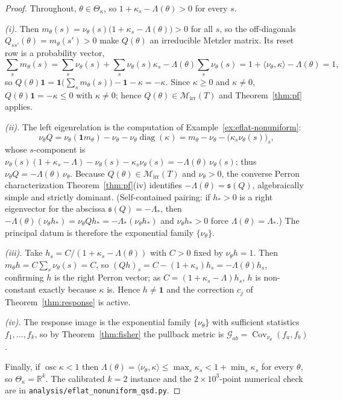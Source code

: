 \documentclass[11pt,reqno]{amsart}
\theoremstyle{plain}
\theoremstyle{definition}
\theoremstyle{remark}
\newcommand{\R}{\mathbb{R}}
\newcommand{\one}{\mathbf{1}}
\newcommand{\abscissa}{\mathfrak{s}}
\DeclareMathOperator{\diag}{diag}
\begin{document}
\begin{proof}
Throughout, $\theta\in\Theta_\kappa$, so $1+\kappa_s-\Lambda(\theta)>0$ for every $s$.

\emph{(i).} Then $m_\theta(s)=\nu_\theta(s)\bigl(1+\kappa_s-\Lambda(\theta)\bigr)>0$ for all $s$, so
the off-diagonals $Q_{ss'}(\theta)=m_\theta(s')>0$ make $Q(\theta)$ an irreducible Metzler matrix. Its
reset row is a probability vector,
\[
\sum_s m_\theta(s)=\sum_s\nu_\theta(s)+\sum_s\nu_\theta(s)\kappa_s-\Lambda(\theta)\sum_s\nu_\theta(s)
=1+\langle\nu_\theta,\kappa\rangle-\Lambda(\theta)=1,
\]
so $Q(\theta)\one=\one\bigl(\textstyle\sum_s m_\theta(s)\bigr)-\one-\kappa=-\kappa$. Since $\kappa\ge0$
and $\kappa\neq0$, $Q(\theta)\one=-\kappa\le0$ with $\kappa\neq0$; hence
$Q(\theta)\in\mathcal M_{\mathrm{irr}}(T)$ and Theorem~\ref{thm:pf} applies.

\emph{(ii).} The left eigenrelation is the computation of Example~\ref{ex:eflat-nonuniform}:
\[
\nu_\theta Q=\nu_\theta(\one m_\theta)-\nu_\theta-\nu_\theta\diag(\kappa)
=m_\theta-\nu_\theta-\bigl(\kappa_s\nu_\theta(s)\bigr)_s,
\]
whose $s$-component is
$\nu_\theta(s)(1+\kappa_s-\Lambda)-\nu_\theta(s)-\kappa_s\nu_\theta(s)=-\Lambda(\theta)\,\nu_\theta(s)$;
thus $\nu_\theta Q=-\Lambda(\theta)\,\nu_\theta$. Because $Q(\theta)\in\mathcal M_{\mathrm{irr}}(T)$ and
$\nu_\theta>0$, the converse Perron characterization Theorem~\ref{thm:pf}(iv) identifies
$-\Lambda(\theta)=\abscissa(Q)$, algebraically simple and strictly dominant. (Self-contained pairing:
if $h_*>0$ is a right eigenvector for the abscissa $\abscissa(Q)=-\Lambda_*$, then
$-\Lambda(\theta)(\nu_\theta h_*)=\nu_\theta Q h_*=-\Lambda_*(\nu_\theta h_*)$ and $\nu_\theta h_*>0$
force $\Lambda(\theta)=\Lambda_*$.) The principal datum is therefore the exponential family
$\{\nu_\theta\}$.

\emph{(iii).} Take $h_s=C/(1+\kappa_s-\Lambda(\theta))$ with $C>0$ fixed by $\nu_\theta h=1$. Then
$m_\theta h=C\sum_s\nu_\theta(s)=C$, so $(Qh)_s=C-(1+\kappa_s)h_s=-\Lambda(\theta)h_s$, confirming $h$
is the right Perron vector; as $C=(1+\kappa_s-\Lambda)h_s$, $h$ is non-constant exactly because
$\kappa$ is. Hence $h\neq\one$ and the correction $c_j$ of Theorem~\ref{thm:response} is active.

\emph{(iv).} The response image is the exponential family $\{\nu_\theta\}$ with sufficient statistics
$f_1,\dots,f_k$, so by Theorem~\ref{thm:fisher} the pullback metric is
$\mathcal G_{ab}=\operatorname{Cov}_{\nu_\theta}(f_a,f_b)$.

Finally, if $\operatorname{osc}\kappa<1$ then
$\Lambda(\theta)=\langle\nu_\theta,\kappa\rangle\le\max_s\kappa_s<1+\min_s\kappa_s$ for every $\theta$,
so $\Theta_\kappa=\R^k$. The calibrated $k=2$ instance and the $2\times10^{3}$-point numerical check
are in \texttt{analysis/eflat\_nonuniform\_qsd.py}.
\end{proof}
\end{document}
